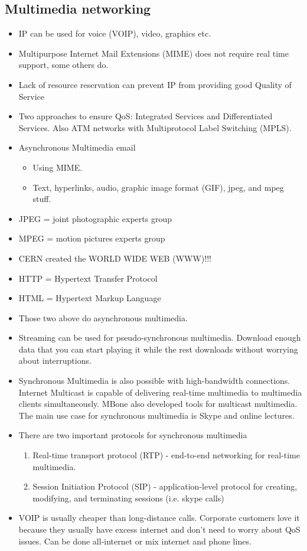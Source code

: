 \documentclass{scrartcl}
\begin{document}
\subsection*{Multimedia networking}
\begin{itemize}
\item IP can be used for voice (VOIP), video, graphics etc.
\item Multipurpose Internet Mail Extensions (MIME) does not require real time
support, some others do.
\item Lack of resource reservation can prevent IP from providing good
Quality of Service
\item Two approaches to ensure QoS: Integrated Services and Differentiated
Services. Also ATM networks with Multiprotocol Label Switching (MPLS).
\item Asynchronous Multimedia email
\begin{itemize}
\item Using MIME.
\item Text, hyperlinks, audio, graphic image format (GIF), jpeg, and mpeg
stuff.\end{itemize}
\item JPEG = joint photographic experts group
\item MPEG = motion pictures experts group
\item CERN created the WORLD WIDE WEB (WWW)!!!
\item HTTP = Hypertext Transfer Protocol
\item HTML = Hypertext Markup Language
\item Those two above do asynchronous multimedia.
\item Streaming can be used for pseudo-synchronous multimedia. Download
enough data that you can start playing it while the rest downloads without
worrying about interruptions.
\item Synchronous Multimedia is also possible with high-bandwidth connections.
Internet Multicast is capable of delivering real-time multimedia to multimedia
clients simultaneously. MBone also developed tools for multicast multimedia.
The main use case for synchronous multimedia is Skype and online lectures.
\item There are two important protocols for synchronous multimedia
\begin{enumerate}
\item Real-time transport protocol (RTP) - end-to-end networking for
real-time multimedia.
\item Session Initiation Protocol (SIP) - application-level protocol for
creating, modifying, and terminating sessions (i.e. skype calls)
\end{enumerate}
\item VOIP is usually cheaper than long-distance calls. Corporate customers
love it because they usually have excess internet and don't need to worry
about QoS issues. Can be done all-internet or mix internet and phone lines.
\end{itemize}
\end{document}
